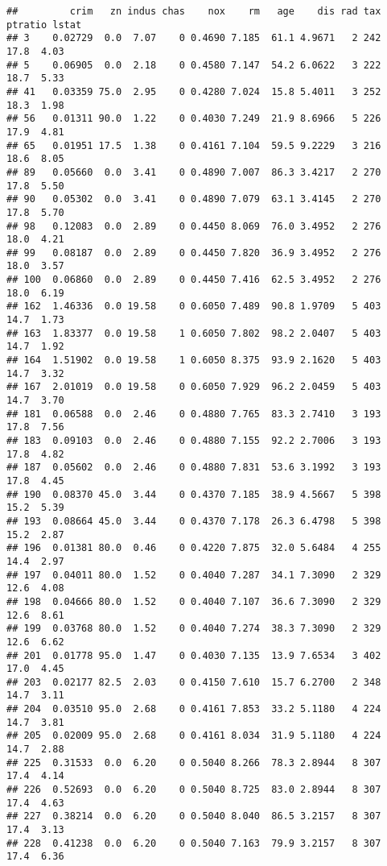 \documentclass[
]{article}
\begin{document}
\begin{verbatim}
##         crim   zn indus chas    nox    rm   age    dis rad tax ptratio lstat
## 3    0.02729  0.0  7.07    0 0.4690 7.185  61.1 4.9671   2 242    17.8  4.03
## 5    0.06905  0.0  2.18    0 0.4580 7.147  54.2 6.0622   3 222    18.7  5.33
## 41   0.03359 75.0  2.95    0 0.4280 7.024  15.8 5.4011   3 252    18.3  1.98
## 56   0.01311 90.0  1.22    0 0.4030 7.249  21.9 8.6966   5 226    17.9  4.81
## 65   0.01951 17.5  1.38    0 0.4161 7.104  59.5 9.2229   3 216    18.6  8.05
## 89   0.05660  0.0  3.41    0 0.4890 7.007  86.3 3.4217   2 270    17.8  5.50
## 90   0.05302  0.0  3.41    0 0.4890 7.079  63.1 3.4145   2 270    17.8  5.70
## 98   0.12083  0.0  2.89    0 0.4450 8.069  76.0 3.4952   2 276    18.0  4.21
## 99   0.08187  0.0  2.89    0 0.4450 7.820  36.9 3.4952   2 276    18.0  3.57
## 100  0.06860  0.0  2.89    0 0.4450 7.416  62.5 3.4952   2 276    18.0  6.19
## 162  1.46336  0.0 19.58    0 0.6050 7.489  90.8 1.9709   5 403    14.7  1.73
## 163  1.83377  0.0 19.58    1 0.6050 7.802  98.2 2.0407   5 403    14.7  1.92
## 164  1.51902  0.0 19.58    1 0.6050 8.375  93.9 2.1620   5 403    14.7  3.32
## 167  2.01019  0.0 19.58    0 0.6050 7.929  96.2 2.0459   5 403    14.7  3.70
## 181  0.06588  0.0  2.46    0 0.4880 7.765  83.3 2.7410   3 193    17.8  7.56
## 183  0.09103  0.0  2.46    0 0.4880 7.155  92.2 2.7006   3 193    17.8  4.82
## 187  0.05602  0.0  2.46    0 0.4880 7.831  53.6 3.1992   3 193    17.8  4.45
## 190  0.08370 45.0  3.44    0 0.4370 7.185  38.9 4.5667   5 398    15.2  5.39
## 193  0.08664 45.0  3.44    0 0.4370 7.178  26.3 6.4798   5 398    15.2  2.87
## 196  0.01381 80.0  0.46    0 0.4220 7.875  32.0 5.6484   4 255    14.4  2.97
## 197  0.04011 80.0  1.52    0 0.4040 7.287  34.1 7.3090   2 329    12.6  4.08
## 198  0.04666 80.0  1.52    0 0.4040 7.107  36.6 7.3090   2 329    12.6  8.61
## 199  0.03768 80.0  1.52    0 0.4040 7.274  38.3 7.3090   2 329    12.6  6.62
## 201  0.01778 95.0  1.47    0 0.4030 7.135  13.9 7.6534   3 402    17.0  4.45
## 203  0.02177 82.5  2.03    0 0.4150 7.610  15.7 6.2700   2 348    14.7  3.11
## 204  0.03510 95.0  2.68    0 0.4161 7.853  33.2 5.1180   4 224    14.7  3.81
## 205  0.02009 95.0  2.68    0 0.4161 8.034  31.9 5.1180   4 224    14.7  2.88
## 225  0.31533  0.0  6.20    0 0.5040 8.266  78.3 2.8944   8 307    17.4  4.14
## 226  0.52693  0.0  6.20    0 0.5040 8.725  83.0 2.8944   8 307    17.4  4.63
## 227  0.38214  0.0  6.20    0 0.5040 8.040  86.5 3.2157   8 307    17.4  3.13
## 228  0.41238  0.0  6.20    0 0.5040 7.163  79.9 3.2157   8 307    17.4  6.36

\end{verbatim}
\end{document}
